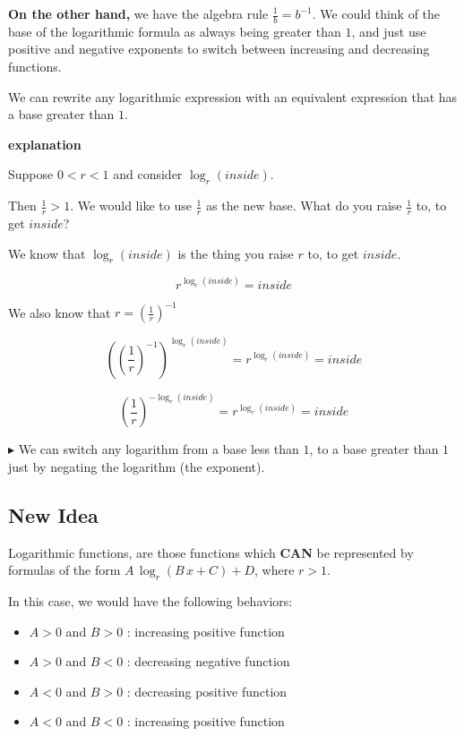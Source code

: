 \documentclass{ximera}
\begin{document}
\textbf{On the other hand,} we have the algebra rule $\frac{1}{b} = b^{-1}$.  We could think of the base of the logarithmic formula as always being greater than $1$, and just use positive and negative exponents to switch between increasing and decreasing functions. 

We can rewrite any logarithmic expression with an equivalent expression that has a base greater than $1$. 



\textbf{\textcolor{red!75!green}{explanation}} 


Suppose $0 < r < 1$ and consider $\log_r(inside)$.

Then $\frac{1}{r} > 1$.  We would like to use $\frac{1}{r}$ as the new base. What do you raise $\frac{1}{r}$ to, to get $inside$?


We know that $\log_r(inside)$ is the thing you raise $r$ to, to get $inside$.



\[
r^{\log_r(inside)} = inside
\]


We also know that $r = \left( \frac{1}{r} \right)^{-1}$ 


\[
\left(\left( \frac{1}{r} \right)^{-1} \right)^{\log_r(inside)} = r^{\log_r(inside)} = inside
\]


\[
\left( \frac{1}{r} \right)^{-\log_r(inside)} = r^{\log_r(inside)} = inside
\]


\textbf{\textcolor{red!70!darkgray}{$\blacktriangleright$}} We can switch any logarithm from a base less than $1$, to a base greater than $1$ just by negating the logarithm (the exponent).




\subsection*{New Idea} 



Logarithmic functions, are those functions which \textbf{\textcolor{red!70!black}{CAN}} be represented by formulas of the form $A \, \log_r(B \, x + C) + D$, where $r > 1$.  


In this case, we would have the following behaviors: 


\begin{itemize}
\item $A > 0$ and $B > 0$ : increasing positive function
\item $A > 0$ and $B < 0$ : decreasing negative function  
\item $A < 0$ and $B > 0$ : decreasing positive function
\item $A < 0$ and $B < 0$ : increasing positive function 
\end{itemize}
\end{document}

